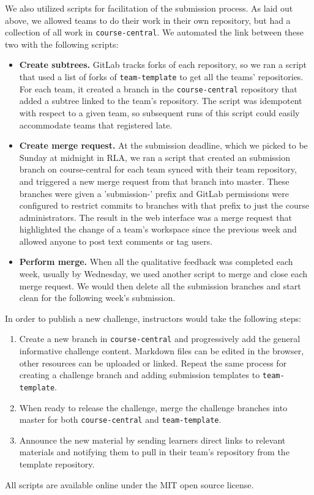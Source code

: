 \documentclass[12pt,twoside]{mitthesis}
\begin{document}
{We also utilized scripts for facilitation of the submission process. As laid out above, we allowed teams to do their work in their own repository, but had a collection of all work in \texttt{course-central}. We automated the link between these two with the following scripts:
\begin{itemize}
\item \textbf{Create subtrees.} GitLab tracks forks of each repository, so we ran a script that used a list of forks of \texttt{team-template} to get all the teams' repositories. For each team, it created a branch in the \texttt{course-central} repository that added a subtree linked to the team's repository. The script was idempotent with respect to a given team, so subsequent runs of this script could easily accommodate teams that registered late.
\item \textbf{Create merge request.} At the submission deadline, which we picked to be Sunday at midnight in RLA, we ran a script that created an submission branch on course-central for each team synced with their team repository, and triggered a new merge request from that branch into master. These branches were given a 'submission-' prefix and GitLab permissions were configured to restrict commits to branches with that prefix to just the course administrators. The result in the web interface was a merge request that highlighted the change of a team's workspace since the previous week and allowed anyone to post text comments or tag users.
\item \textbf{Perform merge.} When all the qualitative feedback was completed each week, usually by Wednesday, we used another script to merge and close each merge request. We would then delete all the submission branches and start clean for the following week's submission.
\end{itemize}

In order to publish a new challenge, instructors would take the following steps:
\begin{enumerate}
\item Create a new branch in \texttt{course-central} and progressively add the general informative challenge content. Markdown files can be edited in the browser, other resources can be uploaded or linked. Repeat the same process for creating a challenge branch and adding submission templates to \texttt{team-template}.
\item When ready to release the challenge, merge the challenge branches into master for both \texttt{course-central} and \texttt{team-template}. 
\item Announce the new material by sending learners direct links to relevant materials and notifying them to pull in their team's repository from the template repository.
\end{enumerate}


All scripts are available online under the MIT open source license.~\cite{rlascripts}}
\end{document}
